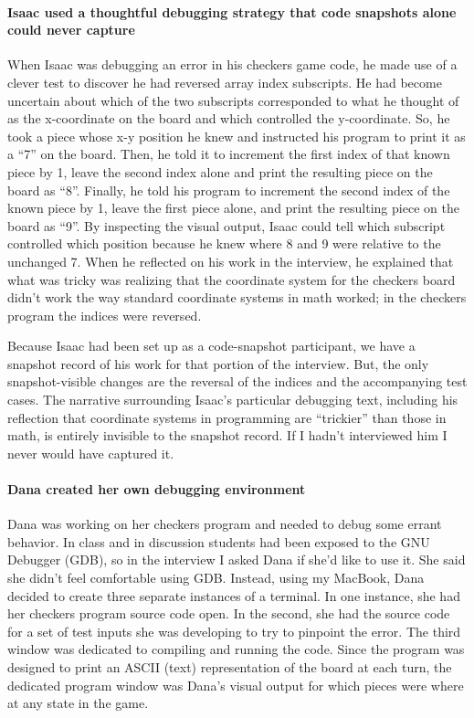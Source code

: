 \paragraph{Isaac used a thoughtful debugging strategy that code
snapshots alone could never
capture}\label{isaac-used-a-thoughtful-debugging-strategy-that-code-snapshots-alone-could-never-capture}

When Isaac was debugging an error in his checkers game code, he made use
of a clever test to discover he had reversed array index subscripts. He
had become uncertain about which of the two subscripts corresponded to
what he thought of as the x-coordinate on the board and which controlled
the y-coordinate. So, he took a piece whose x-y position he knew and
instructed his program to print it as a ``7'' on the board. Then, he
told it to increment the first index of that known piece by 1, leave the
second index alone and print the resulting piece on the board as ``8''.
Finally, he told his program to increment the second index of the known
piece by 1, leave the first piece alone, and print the resulting piece
on the board as ``9''. By inspecting the visual output, Isaac could tell
which subscript controlled which position because he knew where 8 and 9
were relative to the unchanged 7. When he reflected on his work in the
interview, he explained that what was tricky was realizing that the
coordinate system for the checkers board didn't work the way standard
coordinate systems in math worked; in the checkers program the indices
were reversed.

Because Isaac had been set up as a code-snapshot participant, we have a
snapshot record of his work for that portion of the interview. But, the
only snapshot-visible changes are the reversal of the indices and the
accompanying test cases. The narrative surrounding Isaac's particular
debugging text, including his reflection that coordinate systems in
programming are ``trickier'' than those in math, is entirely invisible
to the snapshot record. If I hadn't interviewed him I never would have
captured it.

\paragraph{Dana created her own debugging
environment}\label{dana-created-her-own-debugging-environment}

Dana was working on her checkers program and needed to debug some errant
behavior. In class and in discussion students had been exposed to the
GNU Debugger (GDB), so in the interview I asked Dana if she'd like to
use it. She said she didn't feel comfortable using GDB. Instead, using
my MacBook, Dana decided to create three separate instances of a
terminal. In one instance, she had her checkers program source code
open. In the second, she had the source code for a set of test inputs
she was developing to try to pinpoint the error. The third window was
dedicated to compiling and running the code. Since the program was
designed to print an ASCII (text) representation of the board at each
turn, the dedicated program window was Dana's visual output for which
pieces were where at any state in the game.

